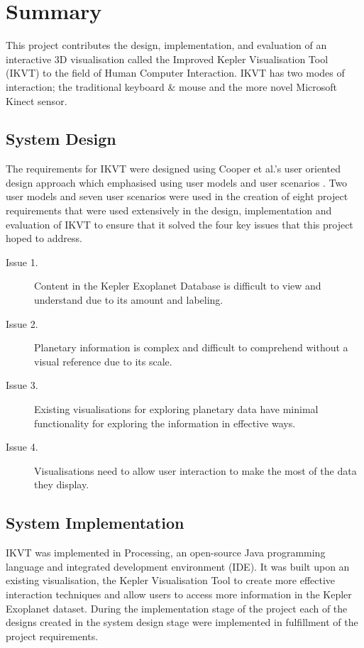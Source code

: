 \chapter{Summary}\label{C:con}
This project contributes the design,
implementation, and evaluation of an
interactive 3D visualisation called the Improved Kepler Visualisation Tool
(IKVT) to the field of Human Computer Interaction. IKVT has two modes of interaction; the traditional keyboard \& mouse and
the more novel Microsoft Kinect sensor. 

\section{System Design}
The requirements for IKVT were designed using Cooper et al.'s user oriented
design approach which emphasised using user models and user scenarios
\cite{AboutFace3}.  Two user
models and seven user scenarios were used in the creation of eight project
requirements that
were used extensively in the design, implementation and evaluation of IKVT to
ensure that it
solved the four key issues that this project hoped to address.
\begin{description}
 \item[Issue 1.] Content in the Kepler Exoplanet Database is difficult to view
and
understand due to its amount and labeling.
 \item[Issue 2.] Planetary information is complex and difficult to comprehend
without
a visual reference due to its scale.
 \item[Issue 3.] Existing visualisations for exploring planetary data have
minimal
functionality for exploring the information in effective ways.
 \item[Issue 4.] Visualisations need to allow user interaction to make the most
of
the data they display.
\end{description}

\section{System Implementation}
IKVT was implemented in Processing, an open-source Java programming language and
integrated development environment (IDE). It was built upon an existing
visualisation, the Kepler Visualisation Tool \cite{kepler_github,
kepler_article} to create more effective interaction techniques and allow users
to access more information in the Kepler Exoplanet dataset. During the
implementation stage of the project each of the
designs created in the system design stage were implemented in
fulfillment of the project requirements. 

